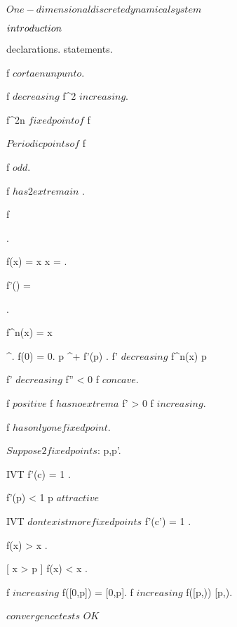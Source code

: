 \documentclass[../Main/main]{subfiles}
\begin{document}
\unit{ $ One-dimensional discrete dynamical system $ }
{
	\introduction
	{ 
		$introduction\\$ 
	}

	{
		{
			declarations.
		}
		\showthat
		{
			statements.
		}
		\demonstration
		{
			f $ corta en un punto $.

			f $ decreasing $ \imp f^2 $ increasing $.

			f^{2n} \convergesto $ fixed point of $ f
		}
	}
	
	
	{
		{
		}
		\study
		{
			$Periodic points of $ f
		}
		\demonstration
		{
			{
				f $ odd $.

				f $ has 2 extrema in $ .

				f 
			}.


			{
				f(x) = x \ifandonlyif x = \pm {}.

				f'(\pm {})  = 
			}.

			{
				f^n(x) = x 
			}
		}
	}


	{
		{
			 \in \C^{\infty}.
			f(0) = 0.
			p \in \R^+ \nonzero \suchthat f'(p) \geq 0.
			f' $ decreasing $
		}
		\showthat
		{
			\all{ x \in \R^+ \nonzero }
			{
				f^n(x) \convergesto p
			}
		}
		\demonstration
		{
			f' $ decreasing $ \imp f'' < 0 \imp f $ concave $.

			f $ positive $ \imp f $ has no extrema $ \imp f' > 0 \imp f $ increasing $.


			f $ has only one fixed point $.

			$Suppose 2 fixed points $: p,p'.

			IVT \imp \ex{ c \in (0,p') }
			{
				f'(c) = 1
			}.

			f'(p) < 1 \imp p $ attractive $

			IVT \imp $ dont exist more fixed points $ \imp f'(c') = 1 \nleq 1.

			\all{ x \in (0,p) }
			{
				f(x) > x
			}.

			{
				f(x) < x
			}.

			f $ increasing $ \imp f([0,p]) = [0,p].
			f $ increasing $ \imp f([p,\infty)) \subset [p,\infty).

			$ convergence tests $ \imp $OK$
		}
	}

	
}
\end{document}

